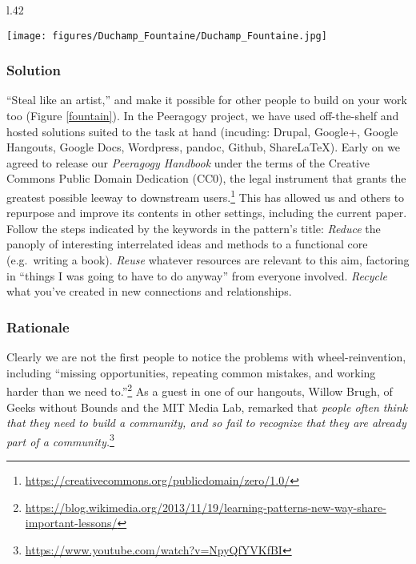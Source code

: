 \begin{wrapfigure}{l}{.42\textwidth}
\vspace{-0cm}
\begin{center}
\texttt{[image: figures/Duchamp\_Fountaine/Duchamp\_Fountaine.jpg]}
\end{center}
\caption{A paradigmatic example of found-art. Caption reads: ``Fountain by R. Mutt, Photograph by Alfred Stieglitz, THE EXHIBIT REFUSED BY THE INDEPENDENTS''. Public domain, via the Wikimedia Commons.\label{fountain}}
\vspace{.3cm}
\end{wrapfigure}


\subsubsection*{Solution} ``Steal like an artist,'' and make it possible for other people to build on your work too (Figure \ref{fountain}).  In the Peeragogy project, we have used off-the-shelf and hosted solutions suited to the task at hand (incuding: Drupal, Google+, Google Hangouts, Google Docs, Wordpress, pandoc, Github, ShareLaTeX).  Early on we agreed to release our \emph{Peeragogy Handbook} under the terms of the Creative Commons Public Domain Dedication (CC0), the legal instrument that grants the greatest possible leeway to downstream users.\footnote{\url{https://creativecommons.org/publicdomain/zero/1.0/}}  This has allowed us and others to repurpose and improve its contents in other settings, including the current paper.  Follow the steps indicated by the keywords in the pattern's title:  \emph{Reduce} the panoply of interesting interrelated ideas and methods to a functional core (e.g.~writing a book).  \emph{Reuse} whatever resources are relevant to this aim, factoring in ``things I was going to have to do anyway'' from everyone involved.  \emph{Recycle} what you've created in new connections and relationships.

\subsubsection*{Rationale} 
Clearly we are not the first people to notice the problems with wheel-reinvention, including ``missing opportunities, repeating common mistakes, and working harder than we need to.''\footnote{\url{https://blog.wikimedia.org/2013/11/19/learning-patterns-new-way-share-important-lessons/}}  As a guest in  one of our hangouts, Willow Brugh, of Geeks without Bounds and the MIT Media Lab, remarked that \emph{people often think that they need to build a community, and so fail to recognize that they are already part of a community.}\footnote{\url{https://www.youtube.com/watch?v=NpyQfYVKfBI}}


